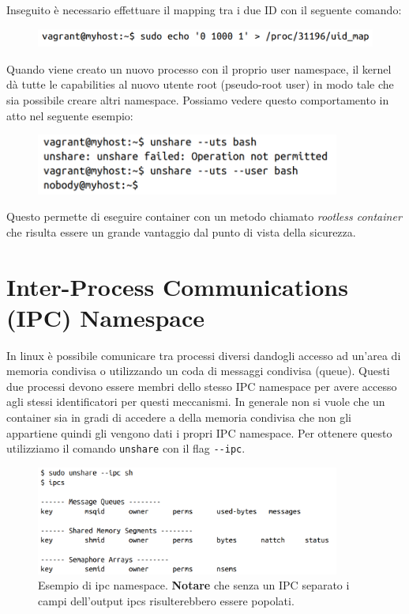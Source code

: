 Inseguito è necessario effettuare il mapping tra i due ID con il seguente comando:

\begin{figure}[H]
    \centering
    \includegraphics[width=\textwidth, keepaspectratio]{capitoli/os_security/imgs/user3.png}
\end{figure}

Quando viene creato un nuovo processo con il proprio user namespace, il kernel
dà tutte le capabilities al nuovo utente root (pseudo-root user) in modo tale che
sia possibile creare altri namespace. Possiamo vedere questo comportamento in atto
nel seguente esempio:

\begin{figure}[H]
    \centering
    \includegraphics[width=10cm, keepaspectratio]{capitoli/os_security/imgs/user4.png}
\end{figure}

Questo permette di eseguire container con un metodo chiamato \textit{rootless container}
che risulta essere un grande vantaggio dal punto di vista della sicurezza.

\section{Inter-Process Communications (IPC) Namespace}

In linux è possibile comunicare tra processi diversi dandogli accesso ad un'area
di memoria condivisa o utilizzando un coda di messaggi condivisa (queue).
Questi due processi devono essere membri dello stesso IPC namespace per avere
accesso agli stessi identificatori per questi meccanismi.
In generale non si vuole che un container sia in gradi di accedere a della memoria
condivisa che non gli appartiene quindi gli vengono dati i propri IPC namespace.
Per ottenere questo utilizziamo il comando \verb|unshare| con il flag \verb|--ipc|.

\begin{figure}[H]
    \centering
    \includegraphics[width=10cm, keepaspectratio]{capitoli/os_security/imgs/user5.png}
    \caption{Esempio di ipc namespace. \textbf{Notare} che senza un IPC separato
        i campi dell'output ipcs risulterebbero essere popolati.}
\end{figure}


